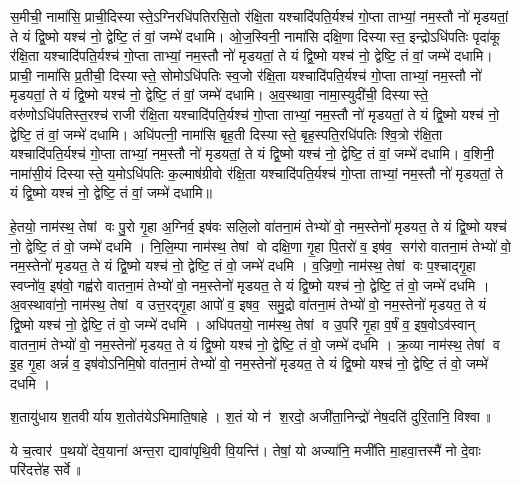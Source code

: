 स॒मीची॒ नामा॑सि॒ प्राची॒दिस्यास्ते॒ऽग्निरधि॑पतिरसि॒तो र॑क्षि॒ता
यश्चादि॑पति॒र्यश्च॑ गो॒प्ता ताभ्यां॒ नम॒स्तौ नो॑ मृडयतां॒
ते यं द्वि॒ष्मो यश्च॑ नो॒ द्वेष्टि॒ तं वां॒ जम्भे॑ दधामि।
ओ॒ज॒स्विनी॒ नामा॑सि दक्षि॒णा दिस्यास्त॒ इन्द्रोऽधि॑पतिः पृदा॑कू र॑क्षि॒ता
यश्चादि॑पति॒र्यश्च॑ गो॒प्ता ताभ्यां॒ नम॒स्तौ नो॑ मृडयतां॒
ते यं द्वि॒ष्मो यश्च॑ नो॒ द्वेष्टि॒ तं वां॒ जम्भे॑ दधामि।
प्राची॒ नामा॑सि प्र॒तीची॒ दिस्यास्ते॒ सोमोऽधि॑पतिः स्व॒जो र॑क्षि॒ता
यश्चादि॑पति॒र्यश्च॑ गो॒प्ता ताभ्यां॒ नम॒स्तौ नो॑ मृडयतां॒
ते यं द्वि॒ष्मो यश्च॑ नो॒ द्वेष्टि॒ तं वां॒ जम्भे॑ दधामि।
अ॒व॒स्थावा॒ नामा॒स्युदी॑ची॒ दिस्यास्ते॒ वरु॑णोऽधि॑पतिस्त॒रश्च॑ राजी र॑क्षि॒ता
यश्चादि॑पति॒र्यश्च॑ गो॒प्ता ताभ्यां॒ नम॒स्तौ नो॑ मृडयतां॒
ते यं द्वि॒ष्मो यश्च॑ नो॒ द्वेष्टि॒ तं वां॒ जम्भे॑ दधामि।
अधि॑पत्नी॒ नामा॑सि बृह॒ती दिस्यास्ते॒ बृह॒स्पति॒रधि॑पतिः श्वि॒त्रो र॑क्षि॒ता
यश्चादि॑पति॒र्यश्च॑ गो॒प्ता ताभ्यां॒ नम॒स्तौ नो॑ मृडयतां॒
ते यं द्वि॒ष्मो यश्च॑ नो॒ द्वेष्टि॒ तं वां॒ जम्भे॑ दधामि।
व॒शिनी॒ नामा॑सी॒यं दिस्यास्ते॒ य॒मोऽधि॑पतिः क॒ल्माष॑ग्रीवो र॑क्षि॒ता
यश्चादि॑पति॒र्यश्च॑ गो॒प्ता ताभ्यां॒ नम॒स्तौ नो॑ मृडयतां॒
ते यं द्वि॒ष्मो यश्च॑ नो॒ द्वेष्टि॒ तं वां॒ जम्भे॑ दधामि॥


हे॒तयो॒ नाम॑स्थ॒ तेषां वः पु॒रो गृ॒हा अ॒ग्निर्व॒ इष॑वः सलि॒लो
वा॑तना॒मं तेभ्यो॑ वो॒ नम॒स्तेनो॑ मृडयत॒
ते यं द्वि॒ष्मो यश्च॑ नो॒ द्वेष्टि॒ तं वो॒ जम्भे॑ दधमि ।
नि॒लि॒म्पा नाम॑स्थ॒ तेषां वो दक्षि॒णा गृ॒हा पि॒तरो॑ व॒ इष॑व॒ सग॑रो
वातना॒मं तेभ्यो॑ वो॒ नम॒स्तेनो॑ मृडयत॒
ते यं द्वि॒ष्मो यश्च॑ नो॒ द्वेष्टि॒ तं वो॒ जम्भे॑ दधमि ।
व॒ज्रिणो॒ नाम॑स्थ॒ तेषां वः प॒श्चाद्गृ॒हा स्वप्नो॑व॒ इष॑वो॒ गह्व॑रो
वातना॒मं तेभ्यो॑ वो॒ नम॒स्तेनो॑ मृडयत॒
ते यं द्वि॒ष्मो यश्च॑ नो॒ द्वेष्टि॒ तं वो॒ जम्भे॑ दधमि ।
अ॒वस्थावा॑नो॒ नाम॑स्थ॒ तेषां व उत्त॒रद्गृ॒हा आपो॑ व॒ इषव॒ समु॒द्रो
वा॑तना॒मं तेभ्यो॑ वो॒ नम॒स्तेनो॑ मृडयत॒
ते यं द्वि॒ष्मो यश्च॑ नो॒ द्वेष्टि॒ तं वो॒ जम्भे॑ दधमि ।
अधि॑पतयो॒ नाम॑स्थ॒ तेषां व उ॒परि॑ गृ॒हा व॒र्षं व॒ इष॒वोऽव॑स्वान्
वातना॒मं तेभ्यो॑ वो॒ नम॒स्तेनो॑ मृडयत॒
ते यं द्वि॒ष्मो यश्च॑ नो॒ द्वेष्टि॒ तं वो॒ जम्भे॑ दधमि ।
क्र॒व्या नाम॑स्थ॒ तेषां व इ॒ह गृ॒हा अन्नं॑ व॒ इष॑वोऽनिमि॒षो
वा॑तना॒मं तेभ्यो॑ वो॒ नम॒स्तेनो॑ मृडयत॒
ते यं द्वि॒ष्मो यश्च॑ नो॒ द्वेष्टि॒ तं वो॒ जम्भे॑ दधमि ।

श॒तायु॑धाय श॒तवीर्याय श॒तोत॑येऽभिमाति॒षाहे।
श॒तं यो न॑ श॒रदो॒ अजी॑ता॒निन्द्रो॑ नेष॒दति॑ दुरि॒तानि॒ विश्वा॥

ये च॒त्वार॑ प॒थयो॑ देव॒याना॑ अन्त॒रा द्यावा॑पृथि॒वी वि॒यन्ति॑।
तेषां॒ यो अज्या॑नि॒ मजी॑ति मा॒हवा॒त्तस्मै॑ नो दे॒वाः परि॑दत्ते॑ह सर्वे॥

